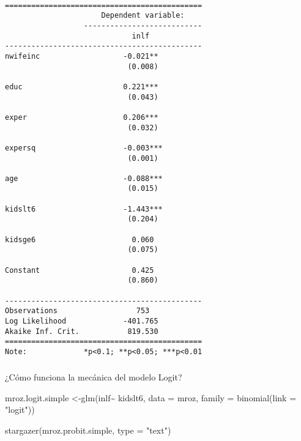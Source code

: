 \documentclass[
  letterpaper,
  DIV=11,
  numbers=noendperiod]{scrreprt}
\makeatletter
\let\oldsubparagraph\subparagraph
\renewcommand{\subparagraph}{
    \@ifstar
      \xxxSubParagraphStar
      \xxxSubParagraphNoStar
  }
\newcommand{\xxxSubParagraphStar}[1]{\oldsubparagraph*{#1}\mbox{}}
\newcommand{\xxxSubParagraphNoStar}[1]{\oldsubparagraph{#1}\mbox{}}
\newenvironment{Shaded}{\begin{snugshade}}{\end{snugshade}}
\newcommand{\AttributeTok}[1]{\textcolor[rgb]{0.40,0.45,0.13}{#1}}
\newcommand{\FunctionTok}[1]{\textcolor[rgb]{0.28,0.35,0.67}{#1}}
\newcommand{\NormalTok}[1]{\textcolor[rgb]{0.00,0.23,0.31}{#1}}
\newcommand{\OtherTok}[1]{\textcolor[rgb]{0.00,0.23,0.31}{#1}}
\newcommand{\SpecialCharTok}[1]{\textcolor[rgb]{0.37,0.37,0.37}{#1}}
\newcommand{\StringTok}[1]{\textcolor[rgb]{0.13,0.47,0.30}{#1}}
\makeatother
\begin{document}
\begin{verbatim}

=============================================
                      Dependent variable:    
                  ---------------------------
                             inlf            
---------------------------------------------
nwifeinc                   -0.021**          
                            (0.008)          
                                             
educ                       0.221***          
                            (0.043)          
                                             
exper                      0.206***          
                            (0.032)          
                                             
expersq                    -0.003***         
                            (0.001)          
                                             
age                        -0.088***         
                            (0.015)          
                                             
kidslt6                    -1.443***         
                            (0.204)          
                                             
kidsge6                      0.060           
                            (0.075)          
                                             
Constant                     0.425           
                            (0.860)          
                                             
---------------------------------------------
Observations                  753            
Log Likelihood             -401.765          
Akaike Inf. Crit.           819.530          
=============================================
Note:             *p<0.1; **p<0.05; ***p<0.01
\end{verbatim}

\subparagraph{¿Cómo funciona la mecánica del modelo
Logit?}\label{cuxf3mo-funciona-la-mecuxe1nica-del-modelo-logit}

\begin{Shaded}
\begin{Highlighting}[]
\NormalTok{mroz.logit.simple }\OtherTok{\textless{}{-}}\FunctionTok{glm}\NormalTok{(inlf}\SpecialCharTok{\textasciitilde{}}
\NormalTok{                           kidslt6,}
                         \AttributeTok{data =}\NormalTok{ mroz,}
                         \AttributeTok{family =} \FunctionTok{binomial}\NormalTok{(}\AttributeTok{link =} \StringTok{"logit"}\NormalTok{))}

\FunctionTok{stargazer}\NormalTok{(mroz.probit.simple, }\AttributeTok{type =} \StringTok{"text"}\NormalTok{)}
\end{Highlighting}
\end{Shaded}
\end{document}
